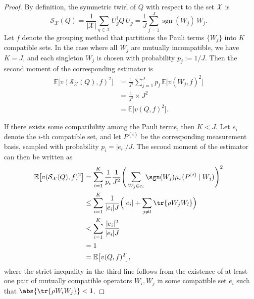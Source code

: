 \documentclass[prl,aps,notitlepage,superscriptaddress,showpacs,nofootinbib]{revtex4-2}
\begin{document}
\begin{proof}
By definition, the symmetric twirl of $Q$ with respect to the set $\mathcal{X}$ is
\begin{equation}
    \mathcal{S}_{\mathcal{X}}(Q) 
    = \frac{1}{|\mathcal{X}|} \sum_{g \in \mathcal{X}} U_g^\dagger Q \, U_g
    = \frac{1}{J} \sum_{j=1}^{J} \operatorname{sgn}(W_j) \, W_j.
\end{equation}
Let $f$ denote the grouping method that partitions the Pauli terms $\{W_j\}$ into $K$ compatible sets. 
In the case where all $W_j$ are mutually incompatible, we have $K=J$, and each singleton $W_j$ is chosen with probability $p_j := 1/J$. Then the second moment of the corresponding estimator is
\begin{align}
    \mathbb{E}\big[v(\mathcal{S}_{\mathcal{X}}(Q), f)^2\big] 
    &= \frac{1}{J^2} \sum_{j=1}^J p_j \, \mathbb{E}\big[v(W_j, f)^2\big] \\
    &= \frac{1}{J^2} \times J^2
    \label{eq:variance_compact_pauli_importance_sampling} \\
    &= \mathbb{E}\big[v(Q,f)^2\big].
\end{align}


If there exists some compatibility among the Pauli terms, then $K<J$. Let $e_i$ denote the $i$-th compatible set, and let $P^{(i)}$ be the corresponding measurement basis, sampled with probability $p_i = |e_i|/J$. The second moment of the estimator can then be written as
\begin{align}
    \mathbb{E}\big[v(\mathcal{S}_{\mathcal{X}}(Q), f)^2\big] 
    &= \sum_{i=1}^{K} \frac{1}{p_i} \frac{1}{J^2} 
       \Bigg( \sum_{W_j \in e_i} \sgn(W_j) \mu_s(P^{(i)} \mid W_j) \Bigg)^2 \\
    &\le \sum_{i=1}^{K} \frac{1}{|e_i| J} 
       \Big( |e_i| + \sum_{j \ne l} \tr{\rho W_j W_l} \Big) \\
    &< \sum_{i=1}^{K} \frac{|e_i|^2}{|e_i| J} \\
    &= 1 \\
    &= \mathbb{E}\big[v(Q, f)^2\big],
\end{align}
where the strict inequality in the third line follows from the existence of at least one pair of mutually compatible operators $W_i, W_j$ in some compatible set $e_i$ such that $\abs{\tr{\rho W_i W_j}} < 1$.




\end{proof}
\end{document}
